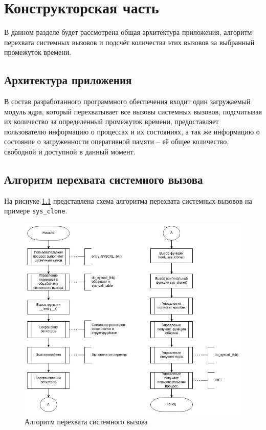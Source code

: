 \chapter{Конструкторская часть}

В данном разделе будет рассмотрена общая архитектура приложения, алгоритм перехвата системных вызовов и подсчёт количества этих вызовов за выбранный промежуток времени.

\section{Архитектура приложения}

В состав разработанного программного обеспечения входит один загружаемый модуль ядра, который перехватывает все вызовы системных вызовов, подсчитывая их количество за определенный промежуток времени, предоставляет пользователю информацию о процессах и их состояниях, а так же информацию о состояние о загруженности оперативной памяти -- её общее количество, свободной и доступной в данный момент.

\section{Алгоритм перехвата системного вызова}

На риснуке \ref{fig:ftrace_algo} представлена схема алгоритма перехвата системных вызовов на примере \texttt{sys\_clone}.

\begin{figure}[h]
	\begin{center}
		\includegraphics[scale=0.6]{img/ftrace_algo.jpg}
	\end{center}
	\caption{Алгоритм перехвата системного вызова}
	\label{fig:ftrace_algo}
\end{figure}

